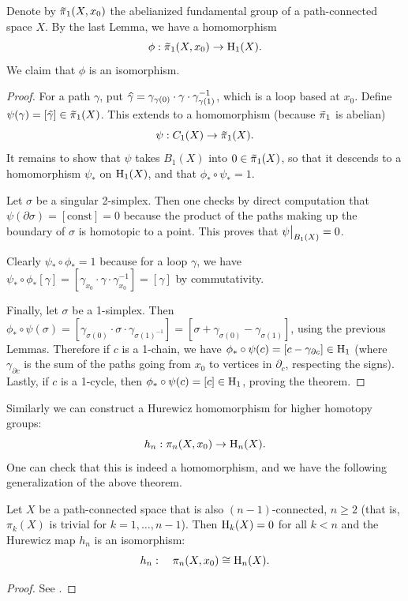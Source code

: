 \begin{thm}[Hurewicz]
    Denote by $\wt{\pi}_1(X,x_0)$ the abelianized fundamental group of a path-connected space $X$. By the last Lemma, we have a homomorphism
    \[\phi: \wt{\pi}_1(X,x_0)\to \rmH_1(X).\]
    We claim that $\phi $ is an isomorphism.
\end{thm}
\begin{proof}
     For a path $\gamma$, put $\wh{\gamma}=\gamma_{\gamma(0)}\cdot \gamma \cdot \gamma_{\gamma(1)}^{-1}$, which is a loop based at $x_0$. Define $\psi(\gamma)=[\wh{\gamma}]\in \wt{\pi}_1(X)$. This extends to a homomorphism (because $\wt{\pi}_1$ is abelian)
     \[\psi:C_1(X)\to \wt{\pi}_1(X).\]
     It remains to show that $\psi$ takes $B_1(X)$ into $0\in\wt{\pi}_1(X)$, so that it descends to a homomorphism $\psi_\ast$ on $\mathrm{H}_1(X)$, and that $\phi_\ast\circ\psi_\ast=1$.
     
     Let $\sigma$ be a singular 2-simplex. Then one checks by direct computation that $\psi(\partial\sigma)=[\text{const}]=0$ because the product of the paths making up the boundary of $\sigma$ is homotopic to a point. This proves that $\restr{\psi}{B_1(X)}=0$.
     
     Clearly $\psi_\ast \circ \phi_\ast=1$ because for a loop $\gamma$, we have $\psi_\ast \circ \phi_\ast[\gamma]=[\gamma_{x_0}\cdot \gamma\cdot \gamma_{x_0}^{-1}]=[\gamma]$ by commutativity.
     
     Finally, let $\sigma$ be a 1-simplex. Then $\phi_\ast \circ \psi(\sigma)=[\gamma_{\sigma(0)}\cdot \sigma\cdot \gamma_{\sigma(1)^{-1}}]=[\sigma+\gamma_{\sigma(0)}-\gamma_{\sigma(1)}]$, using the previous Lemmas. Therefore if $c$ is a 1-chain, we have $\phi_\ast\circ \psi(c)=[c-\gamma_{\partial c}]\in \mathrm{H}_1$ (where $\gamma_{\partial c}$ is the sum of the paths going from $x_0$ to vertices in $\partial_c$, respecting the signs). Lastly, if $c$ is a 1-cycle, then $\phi_\ast \circ\psi(c)=[c]\in \mathrm{H}_1$, proving the theorem.
\end{proof}

Similarly we can construct a Hurewicz homomorphism for higher homotopy groups:
\[h_n:\pi_n(X,x_0)\to \mathrm{H}_n(X).\]
One can check that this is indeed a homomorphism, and we have the following generalization of the above theorem.

\begin{thm}[Hurewicz]
    Let $X$ be a path-connected space that is also $(n-1)$-connected, $n\geq 2$ (that is, $\pi_k(X)$ is trivial for $k=1,\ldots,n-1$). Then $\mathrm{H}_k(X)=0$ for all $k<n$ and the Hurewicz map $h_n$ is an isomorphism:
    \[h_n:\quad \pi_n(X,x_0)\cong \mathrm{H}_n(X).\]
\end{thm}
\begin{proof}
     See \cite[Thm.\ VII.10.7]{Bredon}.
\end{proof}




